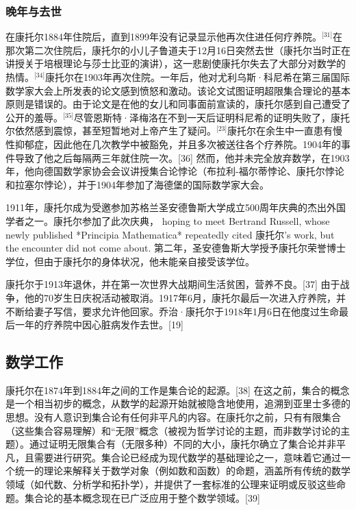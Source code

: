 \subsubsection{晚年与去世}  
在康托尔1884年住院后，直到1899年没有记录显示他再次住进任何疗养院。\(^\text{[31]}\)在那次第二次住院后，康托尔的小儿子鲁道夫于12月16日突然去世（康托尔当时正在讲授关于培根理论与莎士比亚的演讲），这一悲剧使康托尔失去了大部分对数学的热情。\(^\text{[34]}\)康托尔在1903年再次住院。一年后，他对尤利乌斯·科尼希在第三届国际数学家大会上所发表的论文感到愤怒和激动。该论文试图证明超限集合理论的基本原则是错误的。由于论文是在他的女儿和同事面前宣读的，康托尔感到自己遭受了公开的羞辱。\(^\text{[35]}\)尽管恩斯特·泽梅洛在不到一天后证明科尼希的证明失败了，康托尔依然感到震惊，甚至短暂地对上帝产生了疑问。\(^\text{[23]}\)康托尔在余生中一直患有慢性抑郁症，因此他在几次教学中被豁免，并且多次被送往各个疗养院。1904年的事件导致了他之后每隔两三年就住院一次。[36] 然而，他并未完全放弃数学，在1903年，他向德国数学家协会会议讲授集合论悖论（布拉利-福尔蒂悖论、康托尔悖论和拉塞尔悖论），并于1904年参加了海德堡的国际数学家大会。

1911年，康托尔成为受邀参加苏格兰圣安德鲁斯大学成立500周年庆典的杰出外国学者之一。康托尔参加了此次庆典， hoping to meet Bertrand Russell, whose newly published *Principia Mathematica* repeatedly cited 康托尔's work, but the encounter did not come about. 第二年，圣安德鲁斯大学授予康托尔荣誉博士学位，但由于康托尔的身体状况，他未能亲自接受该学位。

康托尔于1913年退休，并在第一次世界大战期间生活贫困，营养不良。[37] 由于战争，他的70岁生日庆祝活动被取消。1917年6月，康托尔最后一次进入疗养院，并不断给妻子写信，要求允许他回家。乔治·康托尔于1918年1月6日在他度过生命最后一年的疗养院中因心脏病发作去世。[19]
\subsection{数学工作}  
康托尔在1874年到1884年之间的工作是集合论的起源。[38] 在这之前，集合的概念是一个相当初步的概念，从数学的起源开始就被隐含地使用，追溯到亚里士多德的思想。没有人意识到集合论有任何非平凡的内容。在康托尔之前，只有有限集合（这些集合容易理解）和“无限”概念（被视为哲学讨论的主题，而非数学讨论的主题）。通过证明无限集合有（无限多种）不同的大小，康托尔确立了集合论并非平凡，且需要进行研究。集合论已经成为现代数学的基础理论之一，意味着它通过一个统一的理论来解释关于数学对象（例如数和函数）的命题，涵盖所有传统的数学领域（如代数、分析学和拓扑学），并提供了一套标准的公理来证明或反驳这些命题。集合论的基本概念现在已广泛应用于整个数学领域。[39]

